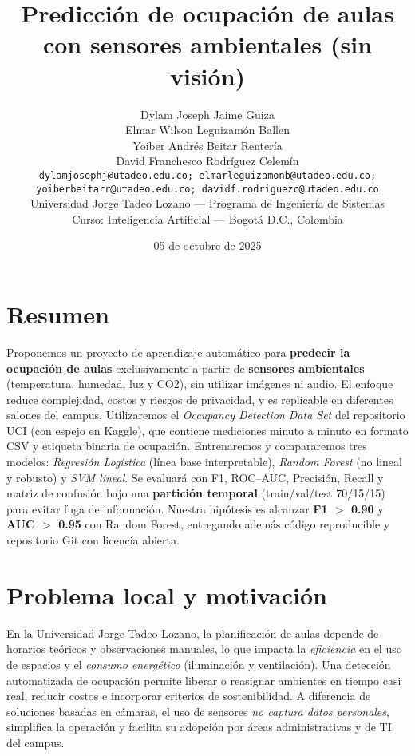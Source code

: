 \documentclass[11pt,letterpaper]{article}
\title{\textbf{Predicción de ocupación de aulas con sensores ambientales (sin visión)}}
\author{%
Dylam Joseph Jaime Guiza\\
Elmar Wilson Leguizamón Ballen\\
Yoiber Andrés Beitar Rentería\\
David Franchesco Rodríguez Celemín\\[4pt]
\texttt{dylamjosephj@utadeo.edu.co; elmarleguizamonb@utadeo.edu.co;}\\
\texttt{yoiberbeitarr@utadeo.edu.co; davidf.rodriguezc@utadeo.edu.co}\\
Universidad Jorge Tadeo Lozano --- Programa de Ingeniería de Sistemas\\
Curso: Inteligencia Artificial --- Bogotá D.C., Colombia}
\date{05 de octubre de 2025}
\begin{document}
\maketitle

\section*{Resumen}
Proponemos un proyecto de aprendizaje automático para \textbf{predecir la ocupación de aulas} exclusivamente a partir de \textbf{sensores ambientales} (temperatura, humedad, luz y CO2), sin utilizar imágenes ni audio. El enfoque reduce complejidad, costos y riesgos de privacidad, y es replicable en diferentes salones del campus. Utilizaremos el \textit{Occupancy Detection Data Set} del repositorio UCI (con espejo en Kaggle), que contiene mediciones minuto a minuto en formato CSV y etiqueta binaria de ocupación. Entrenaremos y compararemos tres modelos: \textit{Regresión Logística} (línea base interpretable), \textit{Random Forest} (no lineal y robusto) y \textit{SVM lineal}. Se evaluará con F1, ROC--AUC, Precisión, Recall y matriz de confusión bajo una \textbf{partición temporal} (train/val/test 70/15/15) para evitar fuga de información. Nuestra hipótesis es alcanzar \textbf{F1 $>$ 0.90} y \textbf{AUC $>$ 0.95} con Random Forest, entregando además código reproducible y repositorio Git con licencia abierta.

\section*{Problema local y motivación}
En la Universidad Jorge Tadeo Lozano, la planificación de aulas depende de horarios teóricos y observaciones manuales, lo que impacta la \textit{eficiencia} en el uso de espacios y el \textit{consumo energético} (iluminación y ventilación). Una detección automatizada de ocupación permite liberar o reasignar ambientes en tiempo casi real, reducir costos e incorporar criterios de sostenibilidad. A diferencia de soluciones basadas en cámaras, el uso de sensores \emph{no captura datos personales}, simplifica la operación y facilita su adopción por áreas administrativas y de TI del campus.
\end{document}
